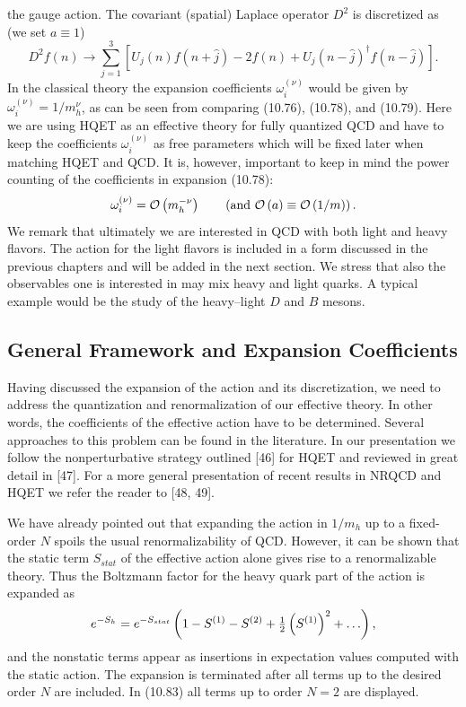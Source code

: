 the gauge action. The covariant (spatial) Laplace operator $D^2$ is discretized
as (we set $a \equiv 1$)
\begin{equation}
  D^2 f(n) \longrightarrow
  \sum_{j=1}^{3}\left[U_j(n)f(n+\hat j) - 2f(n)
  + U_j(n-\hat j)^{\dagger}f(n-\hat j)\right] .
\end{equation}
In the classical theory the expansion coefficients $\omega_i^{(\nu)}$ would be
given by $\omega_i^{(\nu)} = 1/m_h^{\nu}$, as can be seen from comparing
(10.76), (10.78), and (10.79). Here we are using HQET as an effective theory
for fully quantized QCD and have to keep the coefficients $\omega_i^{(\nu)}$
as free parameters which will be fixed later when matching HQET and QCD. It
is, however, important to keep in mind the power counting of the coefficients
in expansion (10.78):
\begin{equation}
  \omega_i^{(\nu)} = \mathcal{O}\left(m_h^{-\nu}\right)
  \qquad \left(\text{and } \mathcal{O}\left(a\right) \equiv \mathcal{O}\left(1/m\right)\right) .
\end{equation}
We remark that ultimately we are interested in QCD with both light and heavy
flavors. The action for the light flavors is included in a form discussed in
the previous chapters and will be added in the next section. We stress that
also the observables one is interested in may mix heavy and light quarks. A
typical example would be the study of the heavy--light $D$ and $B$ mesons.

\subsection{General Framework and Expansion Coefficients}

Having discussed the expansion of the action and its discretization, we need
to address the quantization and renormalization of our effective theory. In
other words, the coefficients of the effective action have to be determined.
Several approaches to this problem can be found in the literature. In our
presentation we follow the nonperturbative strategy outlined [46] for HQET and
reviewed in great detail in [47]. For a more general presentation of recent
results in NRQCD and HQET we refer the reader to [48, 49].

We have already pointed out that expanding the action in $1/m_h$ up to a
fixed-order $N$ spoils the usual renormalizability of QCD. However, it can be
shown that the static term $S_{stat}$ of the effective action alone gives rise
to a renormalizable theory. Thus the Boltzmann factor for the heavy quark part
of the action is expanded as
\begin{equation}
  e^{-S_h} = e^{-S_{stat}}
  \left(1 - S^{(1)} - S^{(2)} + \tfrac{1}{2}\left(S^{(1)}\right)^2 + \ldots\right) ,
\end{equation}
and the nonstatic terms appear as insertions in expectation values computed
with the static action. The expansion is terminated after all terms up to the
desired order $N$ are included. In (10.83) all terms up to order $N = 2$ are
displayed.

